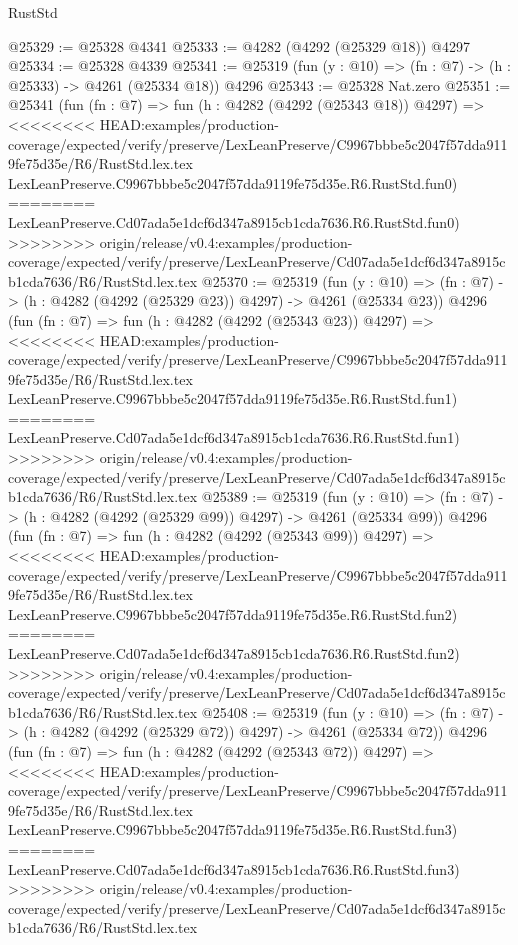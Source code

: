 \begin{lexlean}{RustStd}
\begin{coremodule}
{\begin{coremodule}
{{{{{{{{{{{{{{{{{{{{{{{{{{{{{{{{{{{@25329 := @25328 @4341
@25333 := @4282 (@4292 (@25329 @18)) @4297
@25334 := @25328 @4339
@25341 := @25319 (fun (y : @10) => (fn : @7) -> (h : @25333) -> @4261 (@25334 @18)) @4296
@25343 := @25328 Nat.zero
@25351 := @25341
    (fun (fn : @7) =>
    fun (h : @4282 (@4292 (@25343 @18)) @4297) =>
<<<<<<<< HEAD:examples/production-coverage/expected/verify/preserve/LexLeanPreserve/C9967bbbe5c2047f57dda9119fe75d35e/R6/RustStd.lex.tex
    LexLeanPreserve.C9967bbbe5c2047f57dda9119fe75d35e.R6.RustStd.fun0)
========
    LexLeanPreserve.Cd07ada5e1dcf6d347a8915cb1cda7636.R6.RustStd.fun0)
>>>>>>>> origin/release/v0.4:examples/production-coverage/expected/verify/preserve/LexLeanPreserve/Cd07ada5e1dcf6d347a8915cb1cda7636/R6/RustStd.lex.tex
@25370 := @25319
    (fun (y : @10) => (fn : @7) -> (h : @4282 (@4292 (@25329 @23)) @4297) -> @4261 (@25334 @23))
    @4296
    (fun (fn : @7) =>
    fun (h : @4282 (@4292 (@25343 @23)) @4297) =>
<<<<<<<< HEAD:examples/production-coverage/expected/verify/preserve/LexLeanPreserve/C9967bbbe5c2047f57dda9119fe75d35e/R6/RustStd.lex.tex
    LexLeanPreserve.C9967bbbe5c2047f57dda9119fe75d35e.R6.RustStd.fun1)
========
    LexLeanPreserve.Cd07ada5e1dcf6d347a8915cb1cda7636.R6.RustStd.fun1)
>>>>>>>> origin/release/v0.4:examples/production-coverage/expected/verify/preserve/LexLeanPreserve/Cd07ada5e1dcf6d347a8915cb1cda7636/R6/RustStd.lex.tex
@25389 := @25319
    (fun (y : @10) => (fn : @7) -> (h : @4282 (@4292 (@25329 @99)) @4297) -> @4261 (@25334 @99))
    @4296
    (fun (fn : @7) =>
    fun (h : @4282 (@4292 (@25343 @99)) @4297) =>
<<<<<<<< HEAD:examples/production-coverage/expected/verify/preserve/LexLeanPreserve/C9967bbbe5c2047f57dda9119fe75d35e/R6/RustStd.lex.tex
    LexLeanPreserve.C9967bbbe5c2047f57dda9119fe75d35e.R6.RustStd.fun2)
========
    LexLeanPreserve.Cd07ada5e1dcf6d347a8915cb1cda7636.R6.RustStd.fun2)
>>>>>>>> origin/release/v0.4:examples/production-coverage/expected/verify/preserve/LexLeanPreserve/Cd07ada5e1dcf6d347a8915cb1cda7636/R6/RustStd.lex.tex
@25408 := @25319
    (fun (y : @10) => (fn : @7) -> (h : @4282 (@4292 (@25329 @72)) @4297) -> @4261 (@25334 @72))
    @4296
    (fun (fn : @7) =>
    fun (h : @4282 (@4292 (@25343 @72)) @4297) =>
<<<<<<<< HEAD:examples/production-coverage/expected/verify/preserve/LexLeanPreserve/C9967bbbe5c2047f57dda9119fe75d35e/R6/RustStd.lex.tex
    LexLeanPreserve.C9967bbbe5c2047f57dda9119fe75d35e.R6.RustStd.fun3)
========
    LexLeanPreserve.Cd07ada5e1dcf6d347a8915cb1cda7636.R6.RustStd.fun3)
>>>>>>>> origin/release/v0.4:examples/production-coverage/expected/verify/preserve/LexLeanPreserve/Cd07ada5e1dcf6d347a8915cb1cda7636/R6/RustStd.lex.tex
}}}}}}}}}}}}}}}}}}}}}}}}}}}}}}}}}}}
\end{coremodule}}
\end{coremodule}
\end{lexlean}
